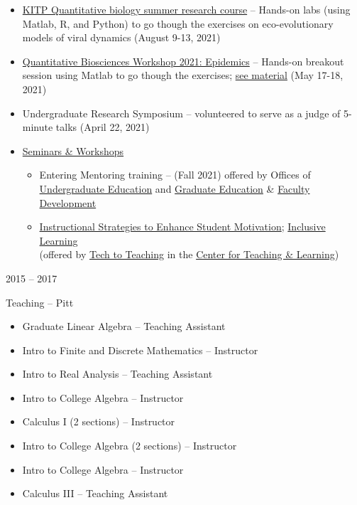\documentclass[a4paper,10pt]{article}
\newlength{\cvcolumngapwidth}
\newlength{\cvleftcolumnwidth}
\newlength{\cvrightcolumnwidth}
\newcommand{\cvtitlestyle}[1]{{\large\cvtitlefont\textcolor{cvtitlecolor}{#1}}}
\newcommand{\cvheadingstyle}[1]{{\normalsize\cvheadingfont\textcolor{cvheadingcolor}{#1}}}
\newlength{\cvafteritemskipamount}
\newlength{\cvaftertitleskipamount}
\newlength{\cvparskip}
\newcommand{\cvitem}[2]{
            \begin{minipage}[t]{\cvleftcolumnwidth}
                \raggedleft #1
            \end{minipage}%
            \hspace{\cvcolumngapwidth}%
            \begin{minipage}[t]{\cvrightcolumnwidth}
                \setlength{\parskip}{\cvparskip} #2
            \end{minipage}
        
            \vspace{\cvafteritemskipamount}
        }
\newcommand{\cvtitle}[1]{
            \cvtitlestyle{#1}
        
            \vspace{\cvaftertitleskipamount}
            \vspace{-\cvparskip}
        }
\begin{document}
{\begin{itemize}[leftmargin=*]
                   \item \href{https://www.kitp.ucsb.edu/qbio}{KITP Quantitative biology summer research course} -- Hands-on labs (using Matlab, R, and Python) to go though the exercises on eco-evolutionary models of viral dynamics  (August 9-13, 2021)
    	\item \href{https://workshop2021.qbios.gatech.edu/schedule/}{Quantitative Biosciences Workshop 2021: Epidemics} -- Hands-on breakout session using Matlab to go though the exercises; \href{https://github.com/Jeremy-D-Harris/qBiosWorkshop2021_TeamOutbreak}{see material} (May 17-18, 2021)
    	\item Undergraduate Research Symposium -- volunteered to serve as a judge of 5-minute talks (April 22, 2021)
	\item {\underline{Seminars \& Workshops}}
		\begin{itemize}[leftmargin=*]
		\item Entering Mentoring training -- (Fall 2021) offered by Offices of \href{https://oue.gatech.edu/}{Undergraduate Education} and \href{https://grad.gatech.edu/}{Graduate Education} \& \href{https://faculty.gatech.edu/office-faculty-professional-development-programs-and-services}{Faculty Development}
		\item {\underline{Instructional Strategies to Enhance Student Motivation}}; {\underline{Inclusive Learning}}  \\
		(offered by \href{https://ctl.gatech.edu/content/tech-teaching-0}{Tech to Teaching} in the \href{https://ctl.gatech.edu/}{Center for Teaching \& Learning}) 
		\end{itemize}
	\end{itemize}
	}



        \cvitem{
            \cvheadingstyle{2015 -- 2017}
        }{
            \cvtitle{Teaching -- Pitt}
            \begin{itemize}[leftmargin=*]
                \item Graduate Linear Algebra -- Teaching Assistant
                	\item Intro to Finite and Discrete Mathematics -- Instructor
        	\item Intro to Real Analysis -- Teaching Assistant
            	\item Intro to College Algebra -- Instructor
            	\item Calculus I (2 sections) -- Instructor
        	\item Intro to College Algebra (2 sections) -- Instructor
        	\item Intro to College Algebra -- Instructor
        	\item Calculus III -- Teaching Assistant
            \end{itemize}
        
        }
        
\end{document}
